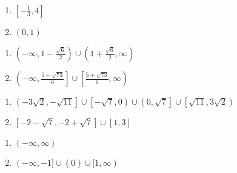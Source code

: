 \begin{multicols}{2}
\begin{enumerate}
\setcounter{enumi}{\value{HW}}

\item $\left[-\frac{1}{3}, 4 \right]$
\item $(0, 1)$

\setcounter{HW}{\value{enumi}}
\end{enumerate}
\end{multicols}

\begin{multicols}{2}
\begin{enumerate}
\setcounter{enumi}{\value{HW}}


\item  $\left(-\infty, 1-\frac{\sqrt{6}}{2} \right) \cup \left(1+\frac{\sqrt{6}}{2}, \infty \right)$

\item  $\left(-\infty, \frac{5 - \sqrt{73}}{6} \right] \cup \left[\frac{5 + \sqrt{73}}{6}, \infty \right)$


\setcounter{HW}{\value{enumi}}
\end{enumerate}
\end{multicols}

\begin{multicols}{2}
\begin{enumerate}
\setcounter{enumi}{\value{HW}}

\item {\scriptsize $\left(-3\sqrt{2}, -\sqrt{11} \right] \cup \left[-\sqrt{7}, 0 \right) \cup \left(0, \sqrt{7} \right] \cup \left[\sqrt{11}, 3\sqrt{2} \right)$}
\item $\left[-2-\sqrt{7}, -2+\sqrt{7} \right] \cup [1, 3]$


\setcounter{HW}{\value{enumi}}
\end{enumerate}
\end{multicols}



\begin{multicols}{2}
\begin{enumerate}
\setcounter{enumi}{\value{HW}}

\item $(-\infty, \infty)$
\item  $(-\infty, -1] \cup \left\{ 0 \right\} \cup [1,\infty)$

\setcounter{HW}{\value{enumi}}
\end{enumerate}
\end{multicols}


